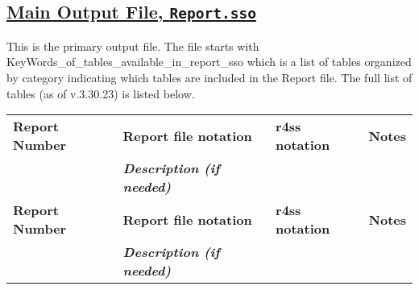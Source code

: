 \begin{landscape}
    \hypertarget{MainOutput}{}
    \subsection[Main Output File, \texttt{Report.sso}]{\protect\hyperlink{MainOutput}{Main Output File, \texttt{Report.sso}}}
    This is the primary output file. The file starts with KeyWords\_of\_tables\_available\_in\_report\_sso which is a list of tables organized by category indicating which tables are included in the Report file. The full list of tables (as of v.3.30.23) is listed below.

	\begin{longtable}{p{1.5cm} p{5.5cm} >{\RaggedRight\arraybackslash}p{4.25cm} p{9.75cm}}
	\hline
	\multirow{1}{1cm}[-0.25cm]{\parbox{1.5cm}{\textbf{Report Number}}} & \textbf{Report file notation} & \textbf{r4ss notation} & \textbf{Notes} \\
    \textbf{} & \textbf{\textit{Description (if needed)}} & \textbf{} & \textbf{} \Bstrut\\ 
	\hline
	\endfirsthead
		
    \hline
    \multirow{1}{1cm}[-0.25cm]{\parbox{1.5cm}{\textbf{Report Number}}} & \textbf{Report file notation} & \textbf{r4ss notation} & \textbf{Notes} \\
    \textbf{} & \textbf{\textit{Description (if needed)}} & \textbf{} & \textbf{} \Bstrut\\  
	\hline
	\endhead


\end{longtable}
\end{landscape}
